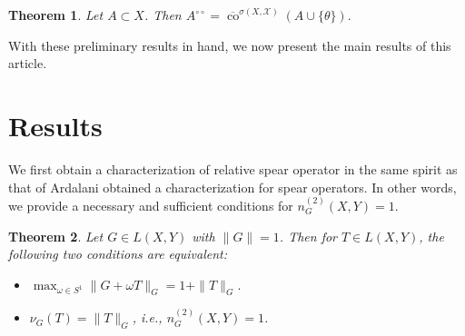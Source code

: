 \documentclass[12pt]{amsart}
\newtheorem{theorem}{Theorem}[section]
\theoremstyle{definition}
\numberwithin{equation}{section}
\begin{document}
    \begin{theorem}\cite[1.5, Theorem]{SchaeferWolff1999}
    Let $A \subset X$. Then $A^{\circ\circ} = \overline{\operatorname{co}}^{\sigma(X,\mathcal{X})}(A \cup \{\theta\}).$
    \end{theorem}
    
	
	With these preliminary results in hand, we now present the main results of this article.
	
	\section{Results}
	\medskip
	
	We first obtain a characterization of relative spear operator in the same spirit as that of Ardalani obtained a characterization for spear operators. In other words, we provide a necessary and sufficient conditions for $n^{(2)}_{G}(X,Y)=1$. 
	

    
	\begin{theorem}
		Let $G\in L(X, Y )$ with $\|G\|=1$. Then for $T\in L(X, Y )$, the following two conditions are equivalent:
		\begin{itemize}
			\item[(i)] $\max_{\omega\in S^1}\|G+\omega T\|_G = 1+\|T\|_G.$
			\item[(ii)] $\nu_G(T)=\|T\|_G$, i.e., $n^{(2)}_{G}(X,Y)=1$.
		\end{itemize}
	\end{theorem}
	
\end{document}
